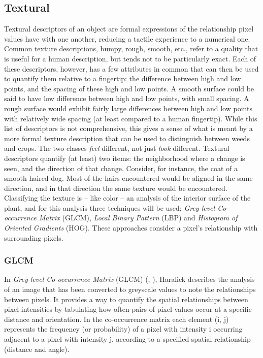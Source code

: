 \documentclass[letterpaper, notitlepage]{report}
\begin{document}
\subsection{Textural}
Textural descriptors of an object are formal expressions of the relationship pixel values have with one another, reducing a tactile experience to a numerical one. Common texture descriptions, bumpy, rough, smooth, etc., refer to a quality that is useful for a human description, but tends not to be particularly exact. Each of these descriptors, however, has a few attributes in common that can then be used to quantify them relative to a fingertip: the difference between high and low points, and the spacing of these high and low points. A smooth surface could be said to have low difference between high and low points, with small spacing. A rough surface would exhibit fairly large differences between high and low points with relatively wide spacing (at least compared to a human fingertip). While this list of descriptors is not comprehensive,  this gives a sense of what is meant by a more formal texture description that can be used to distinguish between weeds and crops. The two classes \textit{feel} different, not just \textit{look} different. Textural descriptors quantify (at least) two items: the neighborhood where a change is seen, and the direction of that change. Consider, for instance, the coat of a smooth-haired dog. Most of the hairs encountered would be aligned in the same direction, and in that direction the same texture would be encountered.
Classifying the texture is -- like color -- an analysis of the interior surface of the plant, and for this analysis three techniques will be used:  \textit{Grey-level Co-occurrence Matrix} (GLCM), \textit{Local Binary Pattern} (LBP) and \textit{Histogram of Oriented Gradients} (HOG). These approaches consider a pixel's relationship with surrounding pixels. 

\subsubsection{GLCM}
In \textit{Grey-level Co-occurrence Matrix} (GLCM) (\cite{Haralick1973-gr}, \cite{Hall-Beyer2017-nx}), Haralick describes the analysis of an image that has been converted to greyscale values to note the relationships between pixels. It provides a way to quantify the spatial relationships between pixel intensities by tabulating how often pairs of pixel values occur at a specific distance and orientation. In the co-occurrence matrix each element (i, j) represents the frequency (or probability) of a pixel with intensity i occurring adjacent to a pixel with intensity j, according to a specified spatial relationship (distance and angle).
\end{document}
